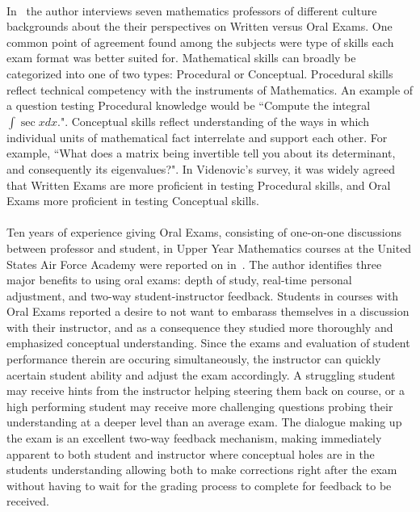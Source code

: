 \documentclass[12pt]{article}
\begin{document}
\paragraph{}
In~\cite{videnovic2017oral} the author interviews seven mathematics professors of different culture backgrounds about the their perspectives on Written versus Oral Exams. One common point of agreement found among the subjects were type of skills each exam format was better suited for. Mathematical skills can broadly be categorized into one of two types: Procedural or Conceptual. Procedural skills reflect technical competency with the instruments of Mathematics. An example of a question testing Procedural knowledge would be ``Compute the integral $\int\sec x dx.$". Conceptual skills reflect understanding of the ways in which individual units of mathematical fact interrelate and support each other. For example, ``What does a matrix being invertible tell you about its determinant, and consequently its eigenvalues?". In Videnovic's survey, it was widely agreed that Written Exams are more proficient in testing Procedural skills, and Oral Exams more proficient in testing Conceptual skills.
\paragraph{}
Ten years of experience giving Oral Exams, consisting of one-on-one discussions between professor and student, in Upper Year Mathematics courses at the United States Air Force Academy were reported on in~\cite{boedigheimer2015individual}. The author identifies three major benefits to using oral exams: depth of study, real-time personal adjustment, and two-way student-instructor feedback. Students in courses with Oral Exams reported a desire to not want to embarass themselves in a discussion with their instructor, and as a consequence they studied more thoroughly and emphasized conceptual understanding. Since the exams and evaluation of student performance therein are occuring simultaneously, the instructor can quickly acertain student ability and adjust the exam accordingly. A struggling student may receive hints from the instructor helping steering them back on course, or a high performing student may receive more challenging questions probing their understanding at a deeper level than an average exam. The dialogue making up the exam is an excellent two-way feedback mechanism, making immediately apparent to both student and instructor where conceptual holes are in the students understanding allowing both to make corrections right after the exam without having to wait for the grading process to complete for feedback to be received.
\end{document}
